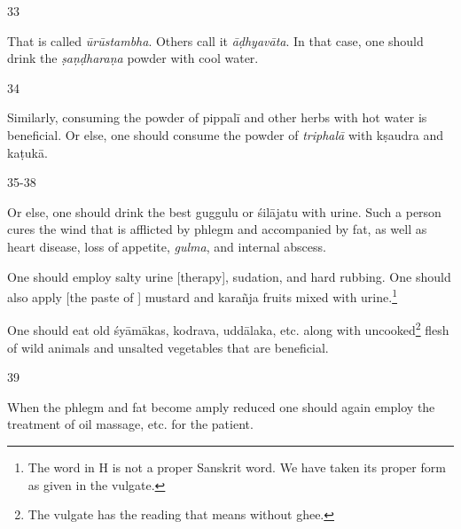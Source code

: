 \begin{translation}
    \item[33]
    \begin{sloka}
    That is called \textit{ūrūstambha}. Others call it \textit{āḍhyavāta}. In that case, one should drink the \textit{ṣaṇḍharaṇa} powder with cool water. 
    \end{sloka}

    \item[34]
    \begin{sloka}
    Similarly, consuming the powder of \gls{pippalī} and other herbs with hot water is beneficial. Or else, one should consume the powder of \textit{triphalā} with \gls{kṣaudra} and \gls{kaṭukā}. 
    \end{sloka}

    \item[35-38]
    \begin{sloka}
    Or else, one should drink the best \gls{guggulu} or \gls{śilājatu} with urine. Such a person cures the wind that is afflicted by phlegm and accompanied by fat, as well as heart disease, loss of appetite, \textit{gulma}, and internal abscess. 

    One should employ salty urine [therapy], sudation, and hard rubbing. One should also apply [the paste of ] mustard and \gls{karañja} fruits mixed with urine.\footnote{The word  in H is not a proper Sanskrit word. We have taken its proper form  as given in the vulgate.}

    One should eat old \gls{śyāmāka}s, \gls{kodrava}, \gls{uddālaka}, etc. along with uncooked\footnote{The vulgate has the reading  that means without ghee.} flesh of wild animals and unsalted vegetables that are beneficial.
    \end{sloka}

    \item[39]
    \begin{sloka}
    When the phlegm and fat become amply reduced one should again employ the treatment of oil massage, etc. for the patient.  
    \end{sloka}
    
\end{translation}
